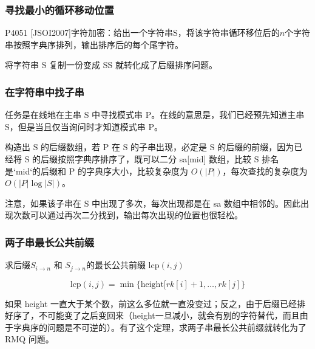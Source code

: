 \subsubsection{寻找最小的循环移动位置}
\par \noindent 
\begin{tcolorbox}
\par \noindent P4051 [JSOI2007]字符加密：给出一个字符串S，将该字符串循环移位后的$n$个字符串按照字典序排列，输出排序后的每个尾字符。

\end{tcolorbox}
\par \noindent  将字符串 S 复制一份变成 SS 就转化成了后缀排序问题。
 
\subsubsection{在字符串中找子串}
\begin{tcolorbox}
\par \noindent 任务是在线地在主串 S 中寻找模式串 P。在线的意思是，我们已经预先知道主串 S，但是当且仅当询问时才知道模式串 P。
\end{tcolorbox}
\par \noindent 构造出 S 的后缀数组，若 P 在 S 的子串出现，必定是 S 的后缀的前缀，因为已经将 S 的后缀按照字典序排序了，既可以二分 sa[mid] 数组，比较 S 排名是`mid`的后缀和 P 的字典序大小，比较复杂度为 $O(|P|)$，每次查找的复杂度为 $O(|P|\log |S|)$。
~\\
\par \noindent 注意，如果该子串在 S 中出现了多次，每次出现都是在 sa 数组中相邻的。因此出现次数可以通过再次二分找到，输出每次出现的位置也很轻松。

\subsubsection{两子串最长公共前缀}
\begin{tcolorbox}
\par \noindent 求后缀$S_{i\to n}$ 和 $S_{j\to n}$的最长公共前缀 $\text{lcp}(i,j)$
\end{tcolorbox}

$$\text{lcp}(i,j)=\min\{\text{height}[rk[i]+1,\dots,rk[j]\}$$


\par \noindent 如果 height 一直大于某个数，前这么多位就一直没变过；反之，由于后缀已经排好序了，不可能变了之后变回来（height一旦减小，就会有别的字符替代，而且由于字典序的问题是不可逆的）。有了这个定理，求两子串最长公共前缀就转化为了 RMQ 问题。

